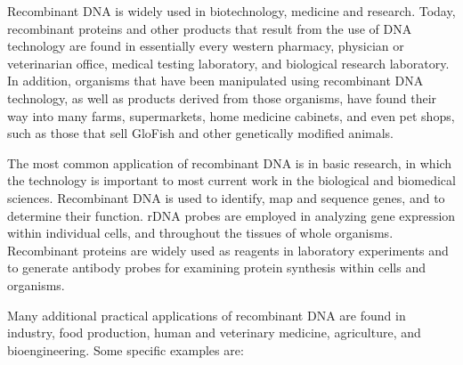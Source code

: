 Recombinant DNA is widely used in biotechnology, medicine and research. Today, recombinant proteins and other products that result from the use of DNA technology are found in essentially every western pharmacy, physician or veterinarian office, medical testing laboratory, and biological research laboratory. In addition, organisms that have been manipulated using recombinant DNA technology, as well as products derived from those organisms, have found their way into many farms, supermarkets, home medicine cabinets, and even pet shops, such as those that sell GloFish and other genetically modified animals.

The most common application of recombinant DNA is in basic research, in which the technology is important to most current work in the biological and biomedical sciences. Recombinant DNA is used to identify, map and sequence genes, and to determine their function. rDNA probes are employed in analyzing gene expression within individual cells, and throughout the tissues of whole organisms. Recombinant proteins are widely used as reagents in laboratory experiments and to generate antibody probes for examining protein synthesis within cells and organisms.

Many additional practical applications of recombinant DNA are found in industry, food production, human and veterinary medicine, agriculture, and bioengineering. Some specific examples are:

